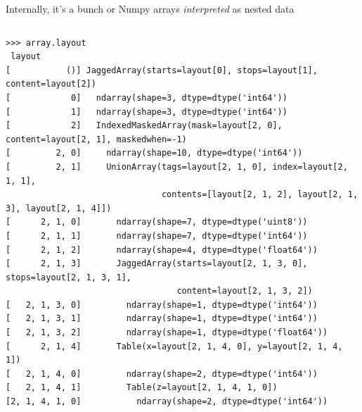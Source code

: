 \documentclass[aspectratio=169]{beamer}
\begin{document}
\begin{frame}[fragile]{Internally, it's a bunch or Numpy arrays {\it interpreted} as nested data}
\begin{columns}
\scriptsize
\begin{verbatim}
>>> array.layout
 layout
[           ()] JaggedArray(starts=layout[0], stops=layout[1], content=layout[2])
[            0]   ndarray(shape=3, dtype=dtype('int64'))
[            1]   ndarray(shape=3, dtype=dtype('int64'))
[            2]   IndexedMaskedArray(mask=layout[2, 0], content=layout[2, 1], maskedwhen=-1)
[         2, 0]     ndarray(shape=10, dtype=dtype('int64'))
[         2, 1]     UnionArray(tags=layout[2, 1, 0], index=layout[2, 1, 1],
                               contents=[layout[2, 1, 2], layout[2, 1, 3], layout[2, 1, 4]])
[      2, 1, 0]       ndarray(shape=7, dtype=dtype('uint8'))
[      2, 1, 1]       ndarray(shape=7, dtype=dtype('int64'))
[      2, 1, 2]       ndarray(shape=4, dtype=dtype('float64'))
[      2, 1, 3]       JaggedArray(starts=layout[2, 1, 3, 0], stops=layout[2, 1, 3, 1],
                                  content=layout[2, 1, 3, 2])
[   2, 1, 3, 0]         ndarray(shape=1, dtype=dtype('int64'))
[   2, 1, 3, 1]         ndarray(shape=1, dtype=dtype('int64'))
[   2, 1, 3, 2]         ndarray(shape=1, dtype=dtype('float64'))
[      2, 1, 4]       Table(x=layout[2, 1, 4, 0], y=layout[2, 1, 4, 1])
[   2, 1, 4, 0]         ndarray(shape=2, dtype=dtype('int64'))
[   2, 1, 4, 1]         Table(z=layout[2, 1, 4, 1, 0])
[2, 1, 4, 1, 0]           ndarray(shape=2, dtype=dtype('int64'))
\end{verbatim}
\end{columns}
\end{frame}
\end{document}
